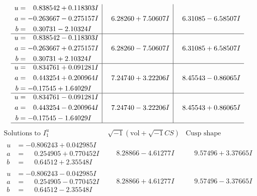 \documentclass[1p]{elsarticle_modified}
\theoremstyle{definition}
\newcommand{\I}{\sqrt{-1}}
\begin{document}
$$\begin{array}{c|c|c}
\begin{aligned}
u &= \phantom{-}0.838542 + 0.118303 I \\
a &= -0.263667 - 0.275157 I \\
b &= \phantom{-}0.30731 - 2.10324 I\end{aligned}
 & \phantom{-}6.28260 + 7.50607 I & \phantom{-}6.31085 - 6.58507 I \\ \hline\begin{aligned}
u &= \phantom{-}0.838542 - 0.118303 I \\
a &= -0.263667 + 0.275157 I \\
b &= \phantom{-}0.30731 + 2.10324 I\end{aligned}
 & \phantom{-}6.28260 - 7.50607 I & \phantom{-}6.31085 + 6.58507 I \\ \hline\begin{aligned}
u &= \phantom{-}0.834761 + 0.091281 I \\
a &= \phantom{-}0.443254 + 0.200964 I \\
b &= -0.17545 + 1.64029 I\end{aligned}
 & \phantom{-}7.24740 + 3.22206 I & \phantom{-}8.45543 - 0.86065 I \\ \hline\begin{aligned}
u &= \phantom{-}0.834761 - 0.091281 I \\
a &= \phantom{-}0.443254 - 0.200964 I \\
b &= -0.17545 - 1.64029 I\end{aligned}
 & \phantom{-}7.24740 - 3.22206 I & \phantom{-}8.45543 + 0.86065 I\\
 \hline 
 \end{array}$$\newpage$$\begin{array}{c|c|c}  
\text{Solutions to }I^u_{1}& \I (\text{vol} + \sqrt{-1}CS) & \text{Cusp shape}\\
 \hline 
\begin{aligned}
u &= -0.806243 + 0.042985 I \\
a &= \phantom{-}0.254905 + 0.770452 I \\
b &= \phantom{-}0.64512 + 2.35548 I\end{aligned}
 & \phantom{-}8.28866 - 4.61277 I & \phantom{-}9.57496 + 3.37665 I \\ \hline\begin{aligned}
u &= -0.806243 - 0.042985 I \\
a &= \phantom{-}0.254905 - 0.770452 I \\
b &= \phantom{-}0.64512 - 2.35548 I\end{aligned}
 & \phantom{-}8.28866 + 4.61277 I & \phantom{-}9.57496 - 3.37665 I \\ \hline\begin{aligned}

\end{aligned}
\end{array}$$
\end{document}
